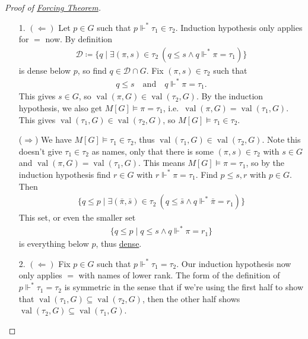 \documentclass{article}
\newcommand{\1}{\mathbbm{1}}
\DeclareMathOperator{\val}{val}
\let\models\vDash
\let\forces\Vdash
\begin{document}
\begin{proof}[Proof of \hyperlink{thm:forcing}{Forcing Theorem}]
\begin{enumerate}
    \item[1.] $(\Leftarrow)$ Let $p \in G$ such that $p \forces^* \tau_1 \in \tau_2$.
      Induction hypothesis only applies for $=$ now.
      By definition
      \begin{align*}
        \mathcal{D} \coloneqq \{q \mid \exists (\pi,s) \in \tau_2 \ (q \leq s \land q\forces^* \pi = \tau_1)\}
      \end{align*}
      is dense below $p$, so
      find $q \in \mathcal{D} \cap G$.
      Fix $(\pi,s) \in \tau_2$ such that
      \begin{align*}
        q \leq s \quad \text{and} \quad q \forces^* \pi = \tau_1.
      \end{align*}
      This gives $s \in G$, so $\val(\pi,G) \in \val(\tau_2,G)$.
      By the induction hypothesis, we also get $M[G] \models \pi = \tau_1$, i.e.\ $\val(\pi,G) = \val(\tau_1, G)$.
      This gives $\val(\tau_1,G) \in \val(\tau_2,G)$, so $M[G] \models \tau_1 \in \tau_2$.

      \newlec
      ($\Rightarrow$) We have $M[G] \models \tau_1 \in \tau_2$, thus $\val(\tau_1, G) \in \val(\tau_2,G)$.
      Note this doesn't give $\tau_1 \in \tau_2$ as names, only that there is some $(\pi,s) \in \tau_2$ with $s \in G$ and $\val(\pi,G) = \val(\tau_1,G)$.
      This means $M[G] \models \pi = \tau_1$, so by the induction hypothesis find $r \in G$ with $r \forces^* \pi = \tau_1$.
      Find $p \leq s,r$ with $p \in G$. Then
      \begin{align*}
        \{q \leq p \mid \exists(\bar{\pi}, \bar{s}) \in \tau_2 \ (q \leq \bar{s} \land q \forces^* \bar{\pi} = r_1)\}
      \end{align*}
      This set, or even the smaller set
      \begin{align*}
        \{q \leq p \mid q \leq s \land q \forces^* \pi = r_1\}
      \end{align*}
      is everything below $p$, thus \hyperlink{def:dense}{dense}.

    \item[2.] $(\Leftarrow)$ Fix $p \in G$ such that $p \forces^* \tau_1 = \tau_2$. Our induction hypothesis now only applies $=$ with names of lower rank.
      The form of the definition of $p \forces^* \tau_1 = \tau_2$ is symmetric in the sense that if we're using the first half to show that $\val(\tau_1, G) \subseteq \val(\tau_2,G)$, then the other half shows $\val(\tau_2,G) \subseteq \val(\tau_1,G)$.


\end{enumerate}
\end{proof}
\end{document}
